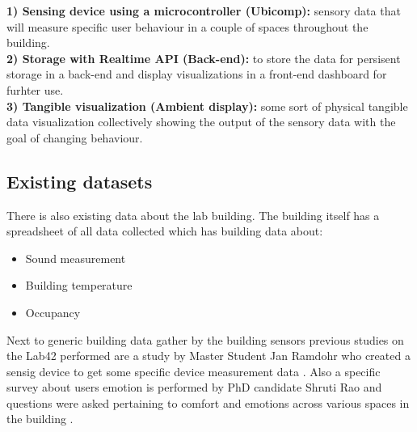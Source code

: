 \textbf{1) Sensing device using a microcontroller (Ubicomp): } sensory data that will measure specific user behaviour in a couple of spaces throughout the building. \\
\textbf{2) Storage with Realtime API (Back-end): } to store the data for persisent storage in a back-end and display visualizations in a front-end dashboard for furhter use. \\
\textbf{3) Tangible visualization (Ambient display): } some sort of physical tangible data visualization collectively showing the output of the sensory data with the goal of changing behaviour.

\subsection{Existing datasets}

There is also existing data about the lab building. The building itself has a spreadsheet of all data collected which has building data about:

\begin{itemize}
  \item Sound measurement
  \item Building temperature
  \item Occupancy
\end{itemize}

Next to generic building data gather by the building sensors previous studies on the Lab42 performed are a study by Master Student Jan Ramdohr who created a sensig device to get some specific device measurement data \cite{sensing}. Also a specific survey about users emotion is performed by PhD candidate Shruti Rao and questions were asked pertaining to comfort and emotions across various spaces in the building \cite{emotion}.